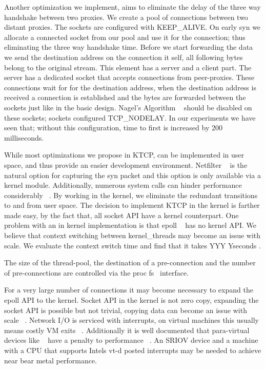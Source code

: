  Another optimization we implement, aims to eliminate the delay of the three way handshake between two proxies. We create a pool of connections between two distant proxies. The sockets are configured with KEEP\_ALIVE. On early syn we allocate a connected socket from our pool and use it for the connection; thus eliminating the three way handshake time. Before we start forwarding the data we send the destination address on the connection it self, all following bytes belong to the original stream. 
This element has a server and a client part. The server has a dedicated socket that accepts connections from peer-proxies. These connections wait for for the destination address, when the destination address is received a connection is established and the bytes are forwarded between the sockets just like in the basic design. Nagel's Algorithm ~\cite{nagel} should be disabled on these sockets; sockets configured TCP\_NODELAY. In our experiments we have seen that; without this configuration, time to first is increased by 200 milliseconds.  

 While most optimizations we propose in KTCP, can be implemented in user space, and thus provide an easier development environment. Netfilter ~\cite{netfilter} is the natural option for capturing the syn packet and this option is only available via a kernel module. Additionally, numerous system calls can hinder performance considerably ~\cite{Copy, FlexSC}. By working in the kernel, we eliminate the redundant transitions to and from user space. The decision to implement KTCP in the kernel is farther made easy, by the fact that, all socket API have a kernel counterpart. One problem with an in kernel implementation is that epoll ~\cite{epoll} has no kernel API. We believe that context switching between kernel\_threads may become an issue with scale. We evaluate the context switch time and find that it takes YYY Yseconds .

 The size of the thread-pool, the destination of a pre-connection and the number of pre-connections are controlled via the proc fs~\cite{proc} interface.

 For a very large number of connections it may become necessary to expand the epoll API to the kernel. Socket API in the kernel is not zero copy, expanding the socket API is possible but not trivial, copying data can become an issue with scale ~\cite{Copy}. Network I/O is serviced with interrupts, on virtual machines this usually means costly VM exits ~\cite{Eli, Elvis}. Additionally it is well documented that para-virtual devices like ~\cite{virtio,vmxnet3} have a penalty to performance ~\cite{Eli, Elvis}. An SRIOV device and a machine with a CPU that supports Intels vt-d posted interrupts may be needed to achieve near bear metal performance.
